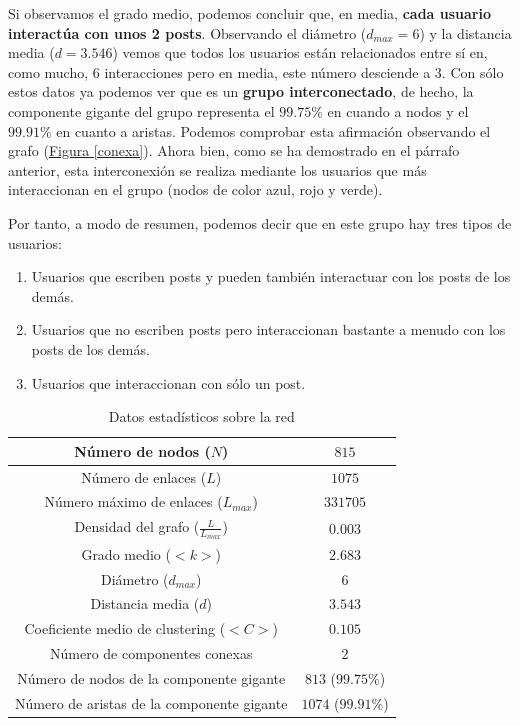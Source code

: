 \documentclass[10pt,a4paper,spanish]{article}
\numberwithin{equation}{section} %
\numberwithin{figure}{section} %
\numberwithin{table}{section} %
\begin{document}
Si observamos el grado medio, podemos concluir que, en media, \textbf{cada usuario interactúa con unos 2 posts}. Observando el diámetro ($d_{max} = 6$) y la distancia media ($d = 3.546$) vemos que todos los usuarios están relacionados entre sí en, como mucho, 6 interacciones pero en media, este número desciende a 3. Con sólo estos datos ya podemos ver que es un \textbf{grupo interconectado}, de hecho, la componente gigante del grupo representa el $99.75\%$ en cuando a nodos y el $99.91\%$ en cuanto a aristas. Podemos comprobar esta afirmación observando el grafo (\hyperref[conexa]{Figura \ref*{conexa}}). Ahora bien, como se ha demostrado en el párrafo anterior, esta interconexión se realiza mediante los usuarios que más interaccionan en el grupo (nodos de color azul, rojo y verde).

Por tanto, a modo de resumen, podemos decir que en este grupo hay tres tipos de usuarios:

\begin{enumerate}[$\bullet$]
    \item Usuarios que escriben posts y pueden también interactuar con los posts de los demás.
    \item Usuarios que no escriben posts pero interaccionan bastante a menudo con los posts de los demás.
    \item Usuarios que interaccionan con sólo un post.
\end{enumerate}

\begin{table}[!h]
\centering
\begin{tabular}{| c | c |}
\hline
Número de nodos ($N$) & $815$ \\
\hline
Número de enlaces ($L$) & $1075$ \\
\hline
Número máximo de enlaces ($L_{max}$) & $331705$ \\
\hline
Densidad del grafo ($\frac{L}{L_{max}}$) & $0.003$ \\
\hline
Grado medio ($<k>$) & $2.683$ \\
\hline
Diámetro ($d_{max}$) & $6$ \\
\hline
Distancia media ($d$) & $3.543$ \\
\hline
Coeficiente medio de clustering ($<C>$) & $0.105$ \\
\hline
Número de componentes conexas & $2$ \\
\hline
Número de nodos de la componente gigante & $813$ ($99.75\%$)\\
\hline
Número de aristas de la componente gigante & $1074$ ($99.91\%$)\\
\hline
\end{tabular}
\caption{Datos estadísticos sobre la red}
\label{tabla}
\end{table}
\end{document}
